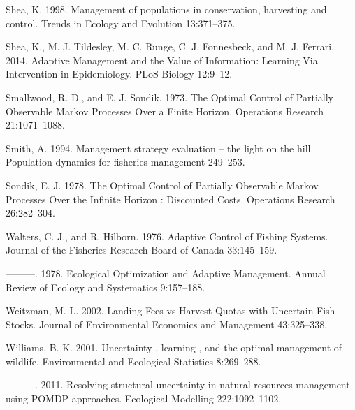 \documentclass[3p]{elsarticle} %
\begin{document}
\leavevmode\hypertarget{ref-Shea1998}{}%
Shea, K. 1998. Management of populations in conservation, harvesting and
control. Trends in Ecology and Evolution 13:371--375.

\leavevmode\hypertarget{ref-Shea2014}{}%
Shea, K., M. J. Tildesley, M. C. Runge, C. J. Fonnesbeck, and M. J.
Ferrari. 2014. Adaptive Management and the Value of Information:
Learning Via Intervention in Epidemiology. PLoS Biology 12:9--12.

\leavevmode\hypertarget{ref-Smallwood1973}{}%
Smallwood, R. D., and E. J. Sondik. 1973. The Optimal Control of
Partially Observable Markov Processes Over a Finite Horizon. Operations
Research 21:1071--1088.

\leavevmode\hypertarget{ref-Smith1994}{}%
Smith, A. 1994. Management strategy evaluation -- the light on the hill.
Population dynamics for fisheries management 249--253.

\leavevmode\hypertarget{ref-Sondik1978}{}%
Sondik, E. J. 1978. The Optimal Control of Partially Observable Markov
Processes Over the Infinite Horizon : Discounted Costs. Operations
Research 26:282--304.

\leavevmode\hypertarget{ref-Walters1976}{}%
Walters, C. J., and R. Hilborn. 1976. Adaptive Control of Fishing
Systems. Journal of the Fisheries Research Board of Canada 33:145--159.

\leavevmode\hypertarget{ref-Walters1978}{}%
---------. 1978. Ecological Optimization and Adaptive Management. Annual
Review of Ecology and Systematics 9:157--188.

\leavevmode\hypertarget{ref-Weitzman2002}{}%
Weitzman, M. L. 2002. Landing Fees vs Harvest Quotas with Uncertain Fish
Stocks. Journal of Environmental Economics and Management 43:325--338.

\leavevmode\hypertarget{ref-Williams2001}{}%
Williams, B. K. 2001. Uncertainty , learning , and the optimal
management of wildlife. Environmental and Ecological Statistics
8:269--288.

\leavevmode\hypertarget{ref-Williams2011}{}%
---------. 2011. Resolving structural uncertainty in natural resources
management using POMDP approaches. Ecological Modelling 222:1092--1102.
\end{document}
